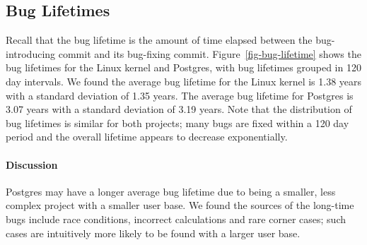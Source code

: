 
\subsection{Bug Lifetimes}
\label{sec-bug-lifetime}
Recall that the bug lifetime is the amount of time elapsed between the
bug-introducing commit and its bug-fixing commit.
Figure~\ref{fig-bug-lifetime} shows the bug lifetimes for the Linux
kernel and Postgres, with bug lifetimes grouped in 120 day
intervals. We found the average bug lifetime for the Linux kernel is
1.38 years with a standard deviation of 1.35 years. The average bug
lifetime for Postgres is 3.07 years with a standard deviation of 3.19
years. Note that the distribution of bug lifetimes is similar for both
projects; many bugs are fixed within a 120 day period and the overall
lifetime appears to decrease exponentially.

\paragraph{Discussion}
Postgres may have a longer average bug lifetime due to being a
smaller, less complex project with a smaller user base. We found the
sources of the long-time bugs include race conditions, incorrect
calculations and rare corner cases; such cases are intuitively more
likely to be found with a larger user base.  

